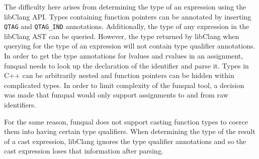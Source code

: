 The difficulty here arises from determining the type of an expression using the libClang API.  Types containing function pointers can be annotated by inserting \lstinline{QTAG} and \lstinline{QTAG_IND} annotations.  Additionally, the type of any expression in the libClang AST can be queried.  However, the type returned by libClang when querying for the type of an expression will not contain type qualifier annotations.  In order to get the type annotations for lvalues and rvalues in an assignment, funqual needs to look up the declaration of the identifier and parse it.  Types in C++ can be arbitrarily nested and function pointers can be hidden within complicated types.  In order to limit complexity of the funqual tool, a decision was made that funqual would only support assignments to and from raw identifiers.  

For the same reason, funqual does not support casting function types to coerce them into having certain type qualifiers.  When determining the type of the result of a cast expression, libClang ignores the type qualifier annotations and so the cast expression loses that information after parsing.  
